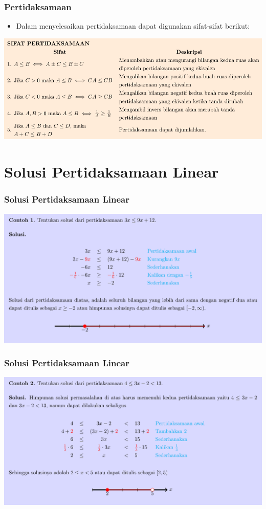 \documentclass[pdflatex,compress,mathserif]{beamer}
\begin{document}
\begin{frame}
	\frametitle{Pertidaksamaan}
	\begin{itemize}
		\item Dalam menyelesaikan pertidaksamaan dapat digunakan sifat-sifat berikut:
	\end{itemize}
	\begin{center}
		\includegraphics[width=\linewidth]{img/img04}
	\end{center}
\end{frame}

\section{Solusi Pertidaksamaan Linear}

\begin{frame}
	\frametitle{Solusi Pertidaksamaan Linear}
	\begin{center}
		\includegraphics[width=\linewidth]{img/img05}
	\end{center}	
\end{frame}

\begin{frame}
	\frametitle{Solusi Pertidaksamaan Linear}
	\begin{center}
		\includegraphics[width=\linewidth]{img/img06}
	\end{center}
\end{frame}
\end{document}
